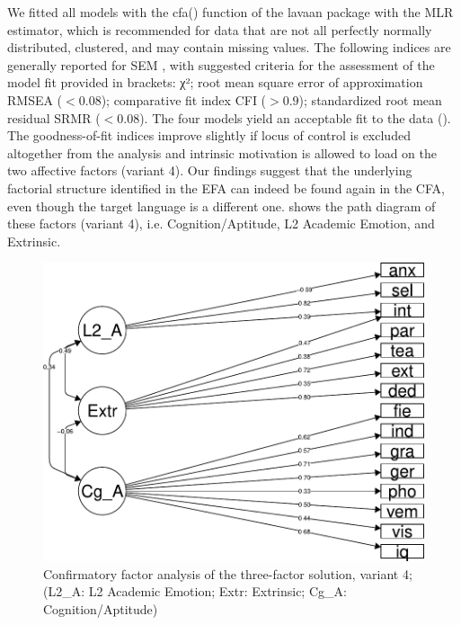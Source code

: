 \documentclass[output=paper]{langsci/langscibook}
\begin{document}


We fitted all models with the cfa() function of the lavaan package \citep{Rosseel2012} with the MLR estimator, which is recommended \citep{Hallquist2018} for data that are not all perfectly normally distributed, clustered, and may contain missing values. The following indices are generally reported for SEM \citep{Kline2011}, with suggested criteria for the assessment of the model fit provided in brackets: χ²; root mean square error of approximation RMSEA ($< 0.08$); comparative fit index CFI ($> 0.9$); standardized root mean residual SRMR ($< 0.08$). The four models yield an acceptable fit to the data (). The goodness-of-fit indices improve slightly if locus of control is excluded altogether from the analysis and intrinsic motivation is allowed to load on the two affective factors (variant 4). Our findings suggest that the underlying factorial structure identified in the EFA can indeed be found again in the CFA, even though the target language is a different one.  shows the path diagram of these factors (variant 4), i.e. Cognition/Aptitude, L2 Academic Emotion, and Extrinsic. 

\begin{figure}
\includegraphics[width=\textwidth]{figures/Figure3.1.pdf}
\caption{\label{fig:03:1}Confirmatory factor analysis of the three-factor solution, variant 4; (L2\_A: L2 Academic Emotion; Extr: Extrinsic; Cg\_A: Cognition/Aptitude)}
\end{figure}
\end{document}
